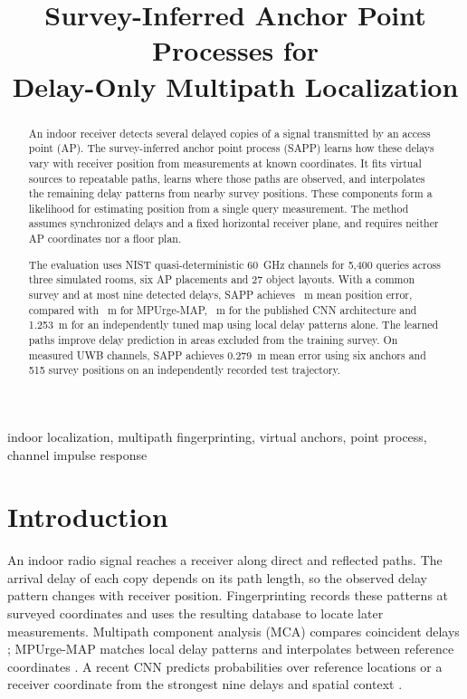 \documentclass[conference]{IEEEtran}
\begin{document}
\title{Survey-Inferred Anchor Point Processes for\\Delay-Only Multipath Localization}
\author{}
\maketitle

\begin{abstract}
An indoor receiver detects several delayed copies of a signal transmitted by an access point (AP). The survey-inferred anchor point process (SAPP) learns how these delays vary with receiver position from measurements at known coordinates. It fits virtual sources to repeatable paths, learns where those paths are observed, and interpolates the remaining delay patterns from nearby survey positions. These components form a likelihood for estimating position from a single query measurement. The method assumes synchronized delays and a fixed horizontal receiver plane, and requires neither AP coordinates nor a floor plan.

The evaluation uses NIST quasi-deterministic 60~GHz channels for 5,400 queries across three simulated rooms, six AP placements and 27 object layouts. With a common survey and at most nine detected delays, SAPP achieves \MedianMean~m mean position error, compared with \MapMean~m for MPUrge-MAP, \CnnMean~m for the published CNN architecture and 1.253~m for an independently tuned map using local delay patterns alone. The learned paths improve delay prediction in areas excluded from the training survey. On measured UWB channels, SAPP achieves 0.279~m mean error using six anchors and 515 survey positions on an independently recorded test trajectory.
\end{abstract}

\begin{IEEEkeywords}
indoor localization, multipath fingerprinting, virtual anchors, point process, channel impulse response
\end{IEEEkeywords}

\section{Introduction}
An indoor radio signal reaches a receiver along direct and reflected paths. The arrival delay of each copy depends on its path length, so the observed delay pattern changes with receiver position. Fingerprinting records these patterns at surveyed coordinates and uses the resulting database to locate later measurements. Multipath component analysis (MCA) compares coincident delays \cite{zayets2017mca}; MPUrge-MAP matches local delay patterns and interpolates between reference coordinates \cite{abdmoulah2026mpurgemap}. A recent CNN predicts probabilities over reference locations or a receiver coordinate from the strongest nine delays and spatial context \cite{abdmoulah2026cnn}.
\end{document}
